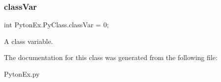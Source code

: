 \subsubsection{\texorpdfstring{class\+Var}{classVar}}
{\footnotesize\ttfamily int Pyton\+Ex.\+Py\+Class.\+class\+Var = 0;\hspace{0.3cm}{\ttfamily [static]}}



A class variable. 



The documentation for this class was generated from the following file\+:\begin{DoxyCompactItemize}
\item 
Pyton\+Ex.\+py\end{DoxyCompactItemize}
